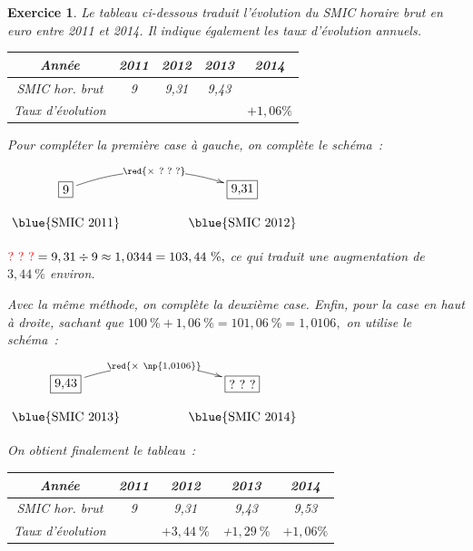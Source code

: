 \documentclass[10pt]{article}
\newtheorem{exo}{Exercice}
\begin{document}
\begin{exo}

Le tableau ci-dessous traduit l'évolution du SMIC horaire brut en euro entre 2011 et 2014. 
Il indique également les taux d'évolution annuels.

\begin{center}
\begin{tabular}{|c|c|c|c|c|}
\hline
Année 		&2011	& 2012	& 2013	& 2014	\\\hline
SMIC hor. brut& 9 &9,31& 9,43& \\\hline
Taux d'évolution&\cellcolor{gray}&	&&$+1,06\%$		\\\hline
\end{tabular}
\end{center}

\medskip

Pour compléter la première case à gauche, on complète le schéma~:

\begin{center}
$\xymatrix@R=0.5pc@C=4pc{
    *+[F]+\txt{9} \ar@/^0.5cm/[r]|{\red{\times ~\text{?~?~?}}} & 
    *+[F]+\txt{9,31}  \\
    \txt{\blue{SMIC 2011}}&
    \txt{\blue{SMIC 2012}}}$
    
    \end{center}
  
  \medskip

$\textcolor{red}{\text{?~?~?}}=9,31\div 9\approx 1,0344=103,44~\%,$ ce qui traduit une augmentation de $3,44~\%$ environ.

Avec la même méthode, on complète la deuxième case. Enfin, pour la case en haut à droite, sachant que $100~\%+1,06~\%=101,06~\%=1,0106,$ on utilise le schéma~:

\begin{center}
$\xymatrix@R=0.5pc@C=4pc{
    *+[F]+\txt{9,43} \ar@/^0.5cm/[r]|{\red{\times ~\np{1,0106}}} & 
    *+[F]+\txt{?~?~?}  \\
    \txt{\blue{SMIC 2013}}&
    \txt{\blue{SMIC 2014}}}$
    
    \end{center}
    
    \medskip
    
    On obtient finalement le tableau~:
    
    \begin{center}
\begin{tabular}{|c|c|c|c|c|}
\hline
Année 		&2011	& 2012	& 2013	& 2014	\\\hline
SMIC hor. brut& 9 &9,31& 9,43&9,53 \\\hline
Taux d'évolution&\cellcolor{gray}&$+3,44~\%$	&+$1,29~\%$&$+1,06\%$		\\\hline
\end{tabular}
\end{center}

\end{exo}
\end{document}
